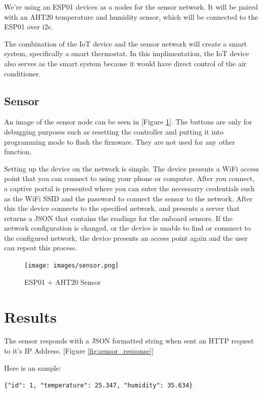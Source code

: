 \documentclass[10pt, journal]{IEEEtran} %
\begin{document}
We're using an ESP01 devices as a nodes for the sensor network.
It will be paired with an AHT20 temperature and humidity sensor, 
which will be connected to the ESP01 over i2c.

The combination of the IoT device and the sensor network will create a smart system, specifically a smart thermostat.
In this implimentation, 
the IoT device also serves as the smart system because it would have direct control of the air conditioner.

\subsection{Sensor}

An image of the sensor node can be seen in [Figure \ref{fig:sensor}].
The buttons are only for debugging purposes such as resetting the controller 
and putting it into programming mode to flash the firmware.
They are not used for any other function.

Setting up the device on the network is simple.
The device presents a WiFi access point that you can connect to using your phone or computer.
After you connect, a captive portal is presented where you can enter the necessarry credentials 
such as the WiFi SSID and the password to connect the sensor to the network.
After this the device connects to the specified network,
and presents a server that returns a JSON that contains the readings for the onboard sensors.
If the network configuration is changed, or the device is unable to find or connnect to the configured network,
the device presents an access point again and the user can repeat this process.

\begin{figure}[h]
    \centering
    \texttt{[image: images/sensor.png]}
    \caption{ESP01 + AHT20 Sensor}
    \label{fig:sensor}
\end{figure}



\section{Results}

The sensor responds with a JSON formatted string when sent an HTTP request to it's IP Address.
[Figure \ref{fig:sensor_response}]

Here is an sample:

\lstinline[basicstyle=\footnotesize]|{"id": 1, "temperature": 25.347, "humidity": 35.634}|
\end{document}
